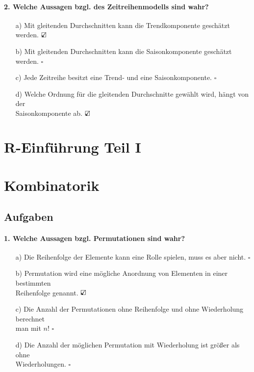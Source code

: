 \documentclass[a4paper]{article}
\begin{document}
\paragraph{2. Welche Aussagen bzgl. des Zeitreihenmodells sind wahr?}

\begin{itemize}
    \item[a)] Mit gleitenden Durchschnitten kann die Trendkomponente geschätzt werden. \hfill $\text{\rlap{$\checkmark$}}\square$
    \item[b)] Mit gleitenden Durchschnitten kann die Saisonkomponente geschätzt werden. \hfill $\square$
    \item[c)] Jede Zeitreihe besitzt eine Trend- und eine Saisonkomponente. \hfill $\square$
    \item[d)] Welche Ordnung für die gleitenden Durchschnitte gewählt wird, hängt von der\\Saisonkomponente ab. \hfill $\text{\rlap{$\checkmark$}}\square$
\end{itemize}


\clearpage


\section{R-Einführung Teil I}


\clearpage


\section{Kombinatorik}

\subsection{Aufgaben}
\paragraph{1. Welche Aussagen bzgl. Permutationen sind wahr?}
\begin{itemize}
    \item[a)] Die Reihenfolge der Elemente kann eine Rolle spielen, muss es aber nicht. \hfill $\square$
    \item[b)] Permutation wird eine mögliche Anordnung von Elementen in einer bestimmten\\ Reihenfolge genannt.  \hfill $\text{\rlap{$\checkmark$}}\square$
    \item[c)] Die Anzahl der Permutationen ohne Reihenfolge und ohne Wiederholung berechnet\\ man mit $n!$ \hfill $\square$
    \item[d)] Die Anzahl der möglichen Permutation mit Wiederholung ist größer als ohne\\ Wiederholungen. \hfill $\square$
\end{itemize}
\end{document}
